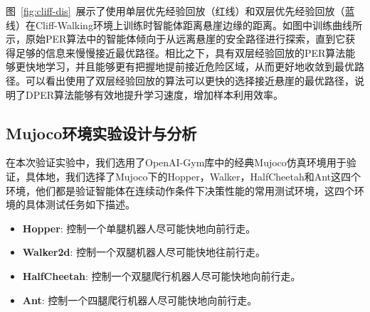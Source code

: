 图~\ref{fig:cliff-dis}~展示了使用单层优先经验回放（红线）和双层优先经验回放（蓝线）在Cliff-Walking环境上训练时智能体距离悬崖边缘的距离。如图中训练曲线所示，原始PER算法中的智能体倾向于从远离悬崖的安全路径进行探索，直到它获得足够的信息来慢慢接近最优路径。相比之下，具有双层经验回放的PER算法能够更快地学习，并且能够更有把握地提前接近危险区域，从而更好地收敛到最优路径。可以看出使用了双层经验回放的算法可以更快的选择接近悬崖的最优路径，说明了DPER算法能够有效地提升学习速度，增加样本利用效率。

\subsection{Mujoco环境实验设计与分析}

在本次验证实验中，我们选用了OpenAI-Gym库中的经典Mujoco仿真环境\cite{todorov2012mujoco}用于验证，具体地，我们选择了Mujoco下的Hopper，Walker，HalfCheetah和Ant这四个环境，他们都是验证智能体在连续动作条件下决策性能的常用测试环境，这四个环境的具体测试任务如下描述。

\begin{itemize}
    \item \textbf{Hopper}: 控制一个单腿机器人尽可能快地向前行走。
    \item \textbf{Walker2d}: 控制一个双腿机器人尽可能快地往前行走。
    \item \textbf{HalfCheetah}: 控制一个双腿爬行机器人尽可能快地向前行走。
    \item \textbf{Ant}: 控制一个四腿爬行机器人尽可能快地向前行走。
\end{itemize}

